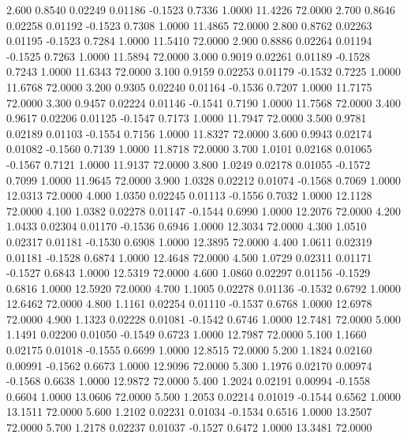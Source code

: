    2.600   0.8540   0.02249   0.01186  -0.1523   0.7336   1.0000  11.4226  72.0000
   2.700   0.8646   0.02258   0.01192  -0.1523   0.7308   1.0000  11.4865  72.0000
   2.800   0.8762   0.02263   0.01195  -0.1523   0.7284   1.0000  11.5410  72.0000
   2.900   0.8886   0.02264   0.01194  -0.1525   0.7263   1.0000  11.5894  72.0000
   3.000   0.9019   0.02261   0.01189  -0.1528   0.7243   1.0000  11.6343  72.0000
   3.100   0.9159   0.02253   0.01179  -0.1532   0.7225   1.0000  11.6768  72.0000
   3.200   0.9305   0.02240   0.01164  -0.1536   0.7207   1.0000  11.7175  72.0000
   3.300   0.9457   0.02224   0.01146  -0.1541   0.7190   1.0000  11.7568  72.0000
   3.400   0.9617   0.02206   0.01125  -0.1547   0.7173   1.0000  11.7947  72.0000
   3.500   0.9781   0.02189   0.01103  -0.1554   0.7156   1.0000  11.8327  72.0000
   3.600   0.9943   0.02174   0.01082  -0.1560   0.7139   1.0000  11.8718  72.0000
   3.700   1.0101   0.02168   0.01065  -0.1567   0.7121   1.0000  11.9137  72.0000
   3.800   1.0249   0.02178   0.01055  -0.1572   0.7099   1.0000  11.9645  72.0000
   3.900   1.0328   0.02212   0.01074  -0.1568   0.7069   1.0000  12.0313  72.0000
   4.000   1.0350   0.02245   0.01113  -0.1556   0.7032   1.0000  12.1128  72.0000
   4.100   1.0382   0.02278   0.01147  -0.1544   0.6990   1.0000  12.2076  72.0000
   4.200   1.0433   0.02304   0.01170  -0.1536   0.6946   1.0000  12.3034  72.0000
   4.300   1.0510   0.02317   0.01181  -0.1530   0.6908   1.0000  12.3895  72.0000
   4.400   1.0611   0.02319   0.01181  -0.1528   0.6874   1.0000  12.4648  72.0000
   4.500   1.0729   0.02311   0.01171  -0.1527   0.6843   1.0000  12.5319  72.0000
   4.600   1.0860   0.02297   0.01156  -0.1529   0.6816   1.0000  12.5920  72.0000
   4.700   1.1005   0.02278   0.01136  -0.1532   0.6792   1.0000  12.6462  72.0000
   4.800   1.1161   0.02254   0.01110  -0.1537   0.6768   1.0000  12.6978  72.0000
   4.900   1.1323   0.02228   0.01081  -0.1542   0.6746   1.0000  12.7481  72.0000
   5.000   1.1491   0.02200   0.01050  -0.1549   0.6723   1.0000  12.7987  72.0000
   5.100   1.1660   0.02175   0.01018  -0.1555   0.6699   1.0000  12.8515  72.0000
   5.200   1.1824   0.02160   0.00991  -0.1562   0.6673   1.0000  12.9096  72.0000
   5.300   1.1976   0.02170   0.00974  -0.1568   0.6638   1.0000  12.9872  72.0000
   5.400   1.2024   0.02191   0.00994  -0.1558   0.6604   1.0000  13.0606  72.0000
   5.500   1.2053   0.02214   0.01019  -0.1544   0.6562   1.0000  13.1511  72.0000
   5.600   1.2102   0.02231   0.01034  -0.1534   0.6516   1.0000  13.2507  72.0000
   5.700   1.2178   0.02237   0.01037  -0.1527   0.6472   1.0000  13.3481  72.0000
